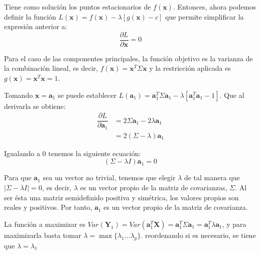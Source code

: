 \noindent Tiene como solución los puntos estacionarios de $f(\textbf{x})$. Entonces, ahora podemos definir la función $L(\textbf{x})= f(\textbf{x})-\lambda[g(\textbf{x})-c]$  que permite simplificar la expresión anterior a:
\begin{equation}
\dfrac{\partial L}{\partial \textbf{x}}=0
\end{equation}

\noindent Para el caso de las componentes principales, la función objetivo es la varianza de la combinación lineal, es decir, $f(\textbf{x})=\textbf{x}^T \Sigma \textbf{x}$ y la restricción aplicada es $g(\textbf{x})=\textbf{x}^T\textbf{x}=1$. 

\noindent Tomando $\textbf{x}=\textbf{a}_1$ se puede establecer $L(\textbf{a}_1)=\textbf{a}_1^T \Sigma \textbf{a}_1 - \lambda[\textbf{a}_1^T \textbf{a}_1-1]$. Que al derivarla se obtiene:
\begin{align*}
\dfrac{\partial L}{\partial \textbf{a}_1} &= 2\Sigma \textbf{a}_1 - 2\lambda\textbf{a}_1\\
& = 2(\Sigma-\lambda)\textbf{a}_1 
\end{align*}

\noindent Igualando a 0 tenemos la siguiente ecuación: 
\begin{equation}
(\Sigma-\lambda I)\textbf{a}_1=0
\end{equation}

\noindent Para que $\textbf{a}_1$ sea un vector no trivial, tenemos que elegir $\lambda$ de tal manera que $|\Sigma-\lambda I| = 0$, es decir, $\lambda$ es un vector propio de la matriz de covarianzas, $\Sigma$. Al ser ésta una matriz semidefinido positiva y simétrica, los valores propios son reales y positivos. Por tanto, $\textbf{a}_1$ es un vector propio de la matriz de covarianza.

\noindent La función a maximizar es $Var(\textbf{Y}_1)=Var(\textbf{a}_1^T\textbf{X})=\textbf{a}_1^T\Sigma \textbf{a}_1=\textbf{a}_1^T\lambda \textbf{a}_1$, y para maximizarla basta tomar $\lambda=\max{\lbrace\lambda_1\ldots \lambda_p\rbrace}$. reordenando si es necesario, se tiene que $\lambda=\lambda_1$ 




